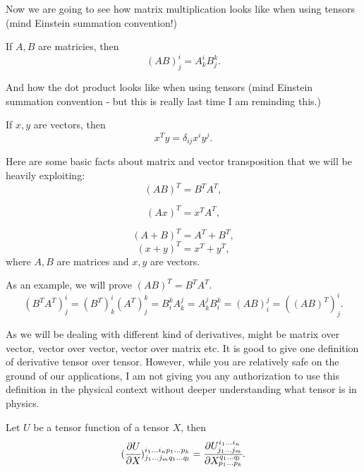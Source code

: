 \documentclass[main.tex]{subfiles}
\begin{document}
Now we are going to see how matrix multiplication looks like when using tensors (mind Einstein summation convention!)

\begin{theorem}
If $A,B$ are matricies, then 
\begin{equation}
(AB)^i_j = A^i_k B^k_j. 
\end{equation}
\end{theorem}

And how the dot product looks like when using tensors (mind Einstein summation convention - but this is really last time I am reminding this.)

\begin{theorem}
If $x, y$ are vectors, then
\begin{equation}
x^T y = \delta_{ij} x^i y^j.
\end{equation}
\end{theorem}

Here are some basic facts about matrix and vector transposition that we will be heavily exploiting:
\begin{equation}
    (AB)^T = B^T A^T,
\end{equation}

\begin{equation}
    (Ax)^T = x^T A^T,
\end{equation}

\begin{equation}
(A + B)^T = A^T + B^T,
\end{equation}
\begin{equation}
    (x + y)^T = x^T + y^T,
\end{equation}
where $A, B$ are matrices and $x, y$ are vectors.

As an example, we will prove $(AB)^T = B^T A^T$.
\begin{equation}
    (B^TA^T)^i_j = (B^T)^i_k (A^T)^k_j = B^k_i A^j_k = A^j_k B^k_i = (AB)^j_i = ((AB)^T)^i_j.
\end{equation}

\indent

As we will be dealing with different kind of derivatives, might be matrix over vector, vector over vector, vector over matrix etc. It is good to give one definition of derivative tensor over tensor. However, while you are relatively safe on the ground of our applications, I am not giving you any authorization to use this definition in the physical context without deeper understanding what tensor is in physics.

\begin{definition}
Let $U$ be a tensor function of a tensor $X$, then 
\begin{equation}
(\cfrac{\partial U}{\partial X})^{i_1\dots i_n p_1\dots p_k}_{j_1\dots j_m q_1\dots q_l} = \cfrac{\partial U^{i_1\dots i_n}_{j_1\dots j_m}}{\partial X^{q_1\dots q_l}_{p_1\dots p_k}}.
\end{equation}
\end{definition}
\end{document}
